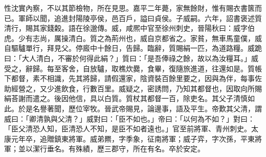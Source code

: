 \begin{pinyinscope}
性沈實內察，不以其節檢物，所在見思。嘉平二年薨，家無餘財，惟有賜衣書篋而已。軍師以聞，追進封陽陵亭侯，邑百戶，謚曰貞侯。子威嗣。六年，詔書褒述質清行，賜其家錢糓。語在徐邈傳。威，咸熈中官至徐州刺史，晉陽秋曰：威字伯虎。少有志尚，厲操清白。質之為荊州也，威自京都省之。家貧，無車馬童僕，威自驅驢單行，拜見父。停廄中十餘日，告歸。臨辭，質賜絹一匹，為道路糧。威跪曰：「大人清白，不審於何得此絹？」質曰：「是吾俸祿之餘，故以為汝糧耳。」威受之，辭歸。每至客舍，自放驢，取樵炊爨，食畢，復隨旅進道，往還如是。質帳下都督，素不相識，先其將歸，請假還家，陰資裝百餘里要之，因與為伴，每事佐助經營之，又少進飲食，行數百里。威疑之，密誘問，乃知其都督也，因取向所賜絹荅謝而遣之。後因他信，具以白質。質杖其都督一百，除吏名。其父子清慎如此。於是名譽著聞，歷位宰牧。晉武帝賜見，論邊事，語及平生。帝歎其父清，謂威曰：「卿清孰與父清？」威對曰：「臣不如也。」帝曰：「以何為不如？」對曰：「臣父清恐人知，臣清恐人不知，是臣不如者遠也。」官至前將軍、青州刺史。太康元年卒，追贈鎮東將軍。威弟羆，字季象，征南將軍；威子弈，字次孫，平東將軍；並以潔行垂名。有殊績，歷三郡守，所在有名。卒於安定。


\end{pinyinscope}